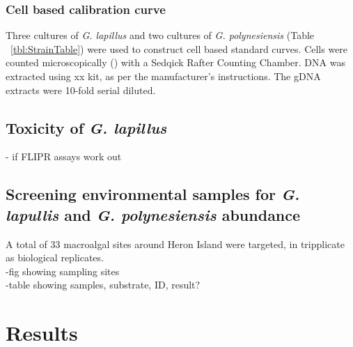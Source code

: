 \documentclass[12pt]{article}
\begin{document}
\subsubsection{Cell based calibration curve}
Three cultures of \emph{G. lapillus} and two cultures of \emph{G. polynesiensis} (Table ~\ref{tbl:StrainTable}) were used to construct cell based standard curves. Cells were counted microscopically () with a Sedqick Rafter Counting Chamber. DNA was extracted using xx kit, as per the manufacturer's instructions. The gDNA extracts were 10-fold serial diluted.
\subsection{Toxicity of \emph{G. lapillus}}
- if FLIPR assays work out
\subsection{Screening environmental samples for \emph{G. lapullis} and \emph{G. polynesiensis} abundance}
A total of 33 macroalgal sites around Heron Island were targeted, in tripplicate as biological replicates.\\
-fig showing sampling sites\\
-table showing samples, substrate, ID, result?
\newpage
\section{Results}
\end{document}
